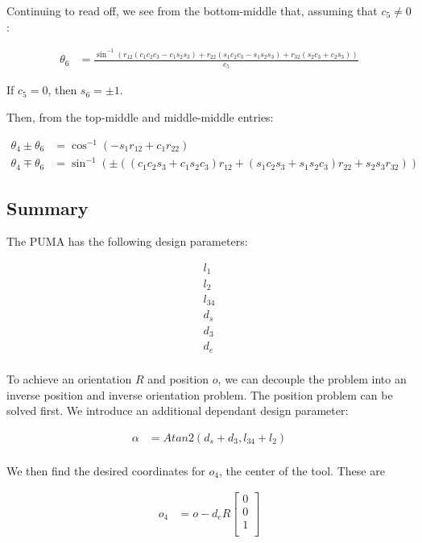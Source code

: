 \documentclass{article}
\begin{document}
Continuing to read off, we see from the bottom-middle that,
	assuming that $c_5 \neq 0$: 

\begin{align*}
\theta_6 & = \frac{\sin^{-1} \left(
		r_{12} ( c_1 c_2 c_3 - c_1 s_2 s_3 ) + r_{22} (s_1 c_2 c_3 - s_1 s_2 s_3)
			+ r_{32} ( s_2 c_3 + c_2 s_3 ) \right) }{c_5}
\end{align*}

If $c_5 = 0$, then $s_6 = \pm 1$.

Then, from the top-middle and middle-middle entries: 

\begin{align*}
\theta_4 \pm \theta_6 & =
	\cos^{-1} \left( - s_1 r_{12} + c_1 r_{22} \right) \\
\theta_4 \mp \theta_6 & =
	\sin^{-1} \left( \pm \left( (c_1 c_2 s_3 + c_1 s_2 c_3) r_{12}
			+ (s_1 c_2 s_3 + s_1 s_2 c_3) r_{22} + s_2 s_3 r_{32} \right) \right)
\end{align*}

\subsection{Summary}

The PUMA has the following design parameters:

\begin{align*}
l_1 \\
l_2 \\
l_{34} \\
d_s \\
d_3 \\
d_e \\
\end{align*}

To achieve an orientation $R$ and position $o$, we can decouple the 
	problem into an inverse position and inverse orientation problem.
The position problem can be solved first.
We introduce an additional dependant design parameter:

\begin{align*}
\alpha & = Atan2(d_s + d_3, l_{34} + l_2)\\
\end{align*}

We then find the desired coordinates for $o_4$, the center of the
	tool.
These are 

\begin{align*}
o_4 & = o - d_e R \left[ \begin{matrix} 0 \\ 0 \\ 1 \\ \end{matrix} \right]
\end{align*}
\end{document}
